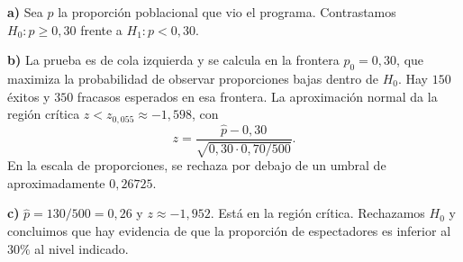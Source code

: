 \textbf{a)} Sea $p$ la proporción poblacional que vio el programa. Contrastamos $H_0:p\ge0{,}30$ frente a $H_1:p<0{,}30$.

\textbf{b)} La prueba es de cola izquierda y se calcula en la frontera $p_0=0{,}30$, que maximiza la probabilidad de observar proporciones bajas dentro de $H_0$. Hay $150$ éxitos y $350$ fracasos esperados en esa frontera. La aproximación normal da la región crítica $z<z_{0{,}055}\approx-1{,}598$, con
\[
z=\frac{\hat p-0{,}30}{\sqrt{0{,}30\cdot0{,}70/500}}.
\]
En la escala de proporciones, se rechaza por debajo de un umbral de aproximadamente $0{,}26725$.

\textbf{c)} $\hat p=130/500=0{,}26$ y $z\approx-1{,}952$. Está en la región crítica. Rechazamos $H_0$ y concluimos que hay evidencia de que la proporción de espectadores es inferior al $30\%$ al nivel indicado.
